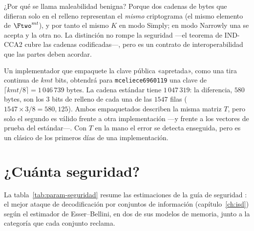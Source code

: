 ¿Por qué se llama maleabilidad benigna? Porque dos cadenas de bytes
que difieran solo en el relleno representan el \emph{mismo}
criptograma (el mismo elemento de $\Ftwo^{mt}$), y por tanto el mismo
$K$ en modo Simply; en modo Narrowly una se acepta y la otra no. La
distinción no rompe la seguridad ---el teorema de IND-CCA2 cubre las
cadenas codificadas---, pero es un contrato de interoperabilidad que
las partes deben acordar.

\begin{trampa}
Un implementador que empaquete la clave pública «apretada», como una
tira continua de $kmt$ bits, obtendrá para \texttt{mceliece6960119}
una clave de $\lceil kmt/8\rceil=1\,046\,739$ bytes. La cadena
estándar tiene $1\,047\,319$: la diferencia, $580$ bytes, son los
$3$ bits de relleno de cada una de las $1547$ filas
($1547\times3/8=580{,}125$). Ambos empaquetados describen la misma
matriz $T$, pero solo el segundo es válido frente a otra
implementación ---y frente a los vectores de prueba del
estándar---. Con $T$ en la mano el error se detecta enseguida, pero es
un clásico de los primeros días de una implementación.
\end{trampa}

\section{¿Cuánta seguridad?}\label{sec:param-seguridad}

La tabla~\ref{tab:param-seguridad} resume las estimaciones de la guía
de seguridad \cite{cmsecurity}: el mejor ataque de decodificación por
conjuntos de información (capítulo~\ref{ch:isd}) según el estimador de
Esser--Bellini, en dos de sus modelos de memoria, junto a la categoría
que cada conjunto reclama.

